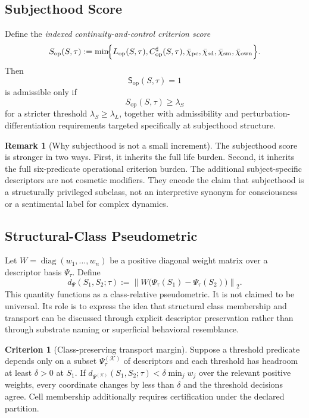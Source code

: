 \documentclass[11pt,a4paper]{article}
\theoremstyle{definition}
\newtheorem{remark}[proposition]{Remark}
\newtheorem{criterion}[proposition]{Criterion}
\newcommand{\Subop}{\mathsf{S}_{\mathrm{op}}}
\newcommand{\PsiVec}{\Psi}
\newcommand{\Priv}{\chi_{\mathrm{pc}}}
\newcommand{\SelfDisc}{\chi_{\mathrm{sd}}}
\newcommand{\SelfModel}{\chi_{\mathrm{sm}}}
\newcommand{\Own}{\chi_{\mathrm{own}}}
\begin{document}
\subsection{Subjecthood Score}
Define the \emph{indexed continuity-and-control criterion score}
\[
S_{\mathrm{op}}(S,\tau)
:=
\min\!\Bigl\{
L_{\mathrm{op}}(S,\tau),
C_{\mathrm{op}}^{\sharp}(S,\tau),
\bar\Priv,\bar\SelfDisc,\bar\SelfModel,\bar\Own
\Bigr\}.
\]
Then
\[
\Subop(S,\tau)=1
\]
is admissible only if
\[
S_{\mathrm{op}}(S,\tau)\ge \lambda_S
\]
for a stricter threshold $\lambda_S \ge \lambda_L$, together with admissibility and perturbation-differentiation requirements targeted specifically at subjecthood structure.

\begin{remark}[Why subjecthood is not a small increment]
The subjecthood score is stronger in two ways. First, it inherits the full life burden. Second, it inherits the full six-predicate operational criterion burden. The additional subject-specific descriptors are not cosmetic modifiers. They encode the claim that subjecthood is a structurally privileged subclass, not an interpretive synonym for consciousness or a sentimental label for complex dynamics.
\end{remark}

\subsection{Structural-Class Pseudometric}
Let $W=\operatorname{diag}(w_1,\dots,w_n)$ be a positive diagonal weight matrix over a descriptor basis $\PsiVec_\tau$. Define
\[
d_{\Psi}(S_1,S_2;\tau)
:=
\left\|W\bigl(\PsiVec_\tau(S_1)-\PsiVec_\tau(S_2)\bigr)\right\|_2.
\]
This quantity functions as a class-relative pseudometric. It is not claimed to be universal. Its role is to express the idea that structural class membership and transport can be discussed through explicit descriptor preservation rather than through substrate naming or superficial behavioral resemblance.

\begin{criterion}[Class-preserving transport margin]
Suppose a threshold predicate depends only on a subset $\PsiVec_\tau^{(\mathcal{K})}$ of descriptors and each threshold has headroom at least $\delta>0$ at $S_1$. If $d_{\Psi^{(\mathcal{K})}}(S_1,S_2;\tau)<\delta\min_j w_j$ over the relevant positive weights, every coordinate changes by less than $\delta$ and the threshold decisions agree. Cell membership additionally requires certification under the declared partition.
\end{criterion}
\end{document}
